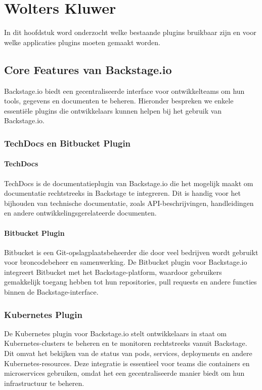 \chapter{Wolters Kluwer}
\label{ch:Onderzoek1}

In dit hoofdstuk word onderzocht welke bestaande plugins bruikbaar zijn en voor welke applicaties plugins moeten gemaakt worden.
\section{Core Features van Backstage.io}

Backstage.io biedt een gecentraliseerde interface voor ontwikkelteams om hun tools, gegevens en documenten te beheren. Hieronder bespreken we enkele essentiële plugins die ontwikkelaars kunnen helpen bij het gebruik van Backstage.io.

\subsection{TechDocs en Bitbucket Plugin}

\subsubsection{TechDocs}
TechDocs is de documentatieplugin van Backstage.io die het mogelijk maakt om documentatie rechtstreeks in Backstage te integreren. Dit is handig voor het bijhouden van technische documentatie, zoals API-beschrijvingen, handleidingen en andere ontwikkelingsgerelateerde documenten.

\subsubsection{Bitbucket Plugin}
Bitbucket is een Git-opslagplaatsbeheerder die door veel bedrijven wordt gebruikt voor broncodebeheer en samenwerking. De Bitbucket plugin voor Backstage.io integreert Bitbucket met het Backstage-platform, waardoor gebruikers gemakkelijk toegang hebben tot hun repositories, pull requests en andere functies binnen de Backstage-interface.

\subsection{Kubernetes Plugin}

De Kubernetes plugin voor Backstage.io stelt ontwikkelaars in staat om Kubernetes-clusters te beheren en te monitoren rechtstreeks vanuit Backstage. Dit omvat het bekijken van de status van pods, services, deployments en andere Kubernetes-resources. Deze integratie is essentieel voor teams die containers en microservices gebruiken, omdat het een gecentraliseerde manier biedt om hun infrastructuur te beheren.

